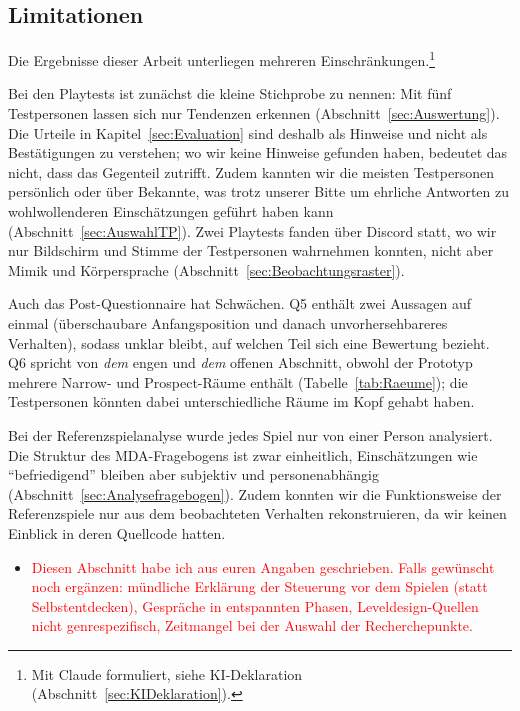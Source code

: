 \documentclass[../Main.tex]{subfiles}
\begin{document}
\subsection{Limitationen} \label{sec:Limitationen}

Die Ergebnisse dieser Arbeit unterliegen mehreren Einschränkungen.\footnote{Mit Claude formuliert, siehe KI-Deklaration (Abschnitt~\ref{sec:KIDeklaration}).}

Bei den Playtests ist zunächst die kleine Stichprobe zu nennen: Mit fünf Testpersonen lassen sich nur Tendenzen erkennen (Abschnitt~\ref{sec:Auswertung}). Die Urteile in Kapitel~\ref{sec:Evaluation} sind deshalb als Hinweise und nicht als Bestätigungen zu verstehen; wo wir keine Hinweise gefunden haben, bedeutet das nicht, dass das Gegenteil zutrifft. Zudem kannten wir die meisten Testpersonen persönlich oder über Bekannte, was trotz unserer Bitte um ehrliche Antworten zu wohlwollenderen Einschätzungen geführt haben kann (Abschnitt~\ref{sec:AuswahlTP}). Zwei Playtests fanden über Discord statt, wo wir nur Bildschirm und Stimme der Testpersonen wahrnehmen konnten, nicht aber Mimik und Körpersprache (Abschnitt~\ref{sec:Beobachtungsraster}).

Auch das Post-Questionnaire hat Schwächen. Q5 enthält zwei Aussagen auf einmal (überschaubare Anfangsposition und danach unvorhersehbareres Verhalten), sodass unklar bleibt, auf welchen Teil sich eine Bewertung bezieht. Q6 spricht von \emph{dem} engen und \emph{dem} offenen Abschnitt, obwohl der Prototyp mehrere Narrow- und Prospect-Räume enthält (Tabelle~\ref{tab:Raeume}); die Testpersonen könnten dabei unterschiedliche Räume im Kopf gehabt haben.

Bei der Referenzspielanalyse wurde jedes Spiel nur von einer Person analysiert. Die Struktur des MDA-Fragebogens ist zwar einheitlich, Einschätzungen wie \enquote{befriedigend} bleiben aber subjektiv und personenabhängig (Abschnitt~\ref{sec:Analysefragebogen}). Zudem konnten wir die Funktionsweise der Referenzspiele nur aus dem beobachteten Verhalten rekonstruieren, da wir keinen Einblick in deren Quellcode hatten.

\begin{itemize}[leftmargin=1.5cm]
    \item \textcolor{red}{Diesen Abschnitt habe ich aus euren Angaben geschrieben. Falls gewünscht noch ergänzen: mündliche Erklärung der Steuerung vor dem Spielen (statt Selbstentdecken), Gespräche in entspannten Phasen, Leveldesign-Quellen nicht genrespezifisch, Zeitmangel bei der Auswahl der Recherchepunkte.}
\end{itemize}
\end{document}

